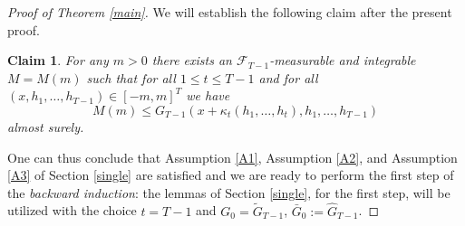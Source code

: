 \documentclass[a4paper]{article}
\newtheorem{claim}[theorem]{Claim}
\begin{document}
\begin{proof}[Proof of Theorem \ref{main}]
We will establish the following claim after the present proof.

\begin{claim}\label{claim} For any $m > 0$  there exists 
an $\mathcal{F}_{T-1}$-measurable and integrable $M = M(m)$ such that for all $1\leq t\leq T-1$ and for all  
$(x,h_1, \ldots, h_{T-1}) \in [-m,m]^{T}$ 
we have $$M(m) \leq G_{T-1}(x + \kappa_{t}(h_1, \ldots, h_{t}), h_1, \ldots, h_{T-1})$$
almost surely.
\end{claim}

One can thus conclude that Assumption \ref{A1}, Assumption \ref{A2}, and Assumption \ref{A3} of Section \ref{single} 
are satisfied and we are ready to perform the first step of the \emph{backward induction}: the 
lemmas of Section \ref{single}, for the first step, will be utilized with the choice $t = T-1$ and $G_0 = \tilde{G}_{T-1}$,
$\bar{G}_{0}:=\hat{G}_{T-1}$.



\end{proof}
\end{document}
